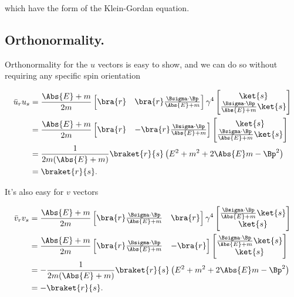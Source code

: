 which have the form of the Klein-Gordan equation.

\subsection{Orthonormality.}

Orthonormality for the $u$ vectors is easy to show, and we can do so without requiring any specific spin orientation

\begin{align*}
\bar{u}_r u_s 
&= 
\frac{\Abs{E} + m}{2m}
\begin{bmatrix}
\bra{r} &
\bra{r} \frac{\Bsigma \cdot \Bp}{\Abs{E} + m} 
\end{bmatrix}
\gamma^4
\begin{bmatrix}
\ket{s} \\
\frac{\Bsigma \cdot \Bp}{\Abs{E} + m} \ket{s}
\end{bmatrix} \\
&=
\frac{\Abs{E} + m}{2m}
\begin{bmatrix}
\bra{r} &
-\bra{r} \frac{\Bsigma \cdot \Bp}{\Abs{E} + m} 
\end{bmatrix}
\begin{bmatrix}
\ket{s} \\
\frac{\Bsigma \cdot \Bp}{\Abs{E} + m} \ket{s}
\end{bmatrix} \\
&=
\frac{1}{2m(\Abs{E} + m)}
\braket{r}{s} \left( E^2 + m^2 + 2 \Abs{E} m - \Bp^2 \right) \\
&=
\braket{r}{s}.
\end{align*}

It's also easy for $v$ vectors

\begin{align*}
\bar{v}_r v_s 
&= 
\frac{\Abs{E} + m}{2m}
\begin{bmatrix}
\bra{r} \frac{\Bsigma \cdot \Bp}{\Abs{E} + m} &
\bra{r} 
\end{bmatrix}
\gamma^4
\begin{bmatrix}
\frac{\Bsigma \cdot \Bp}{\Abs{E} + m} \ket{s} \\
\ket{s} 
\end{bmatrix} \\
&=
\frac{\Abs{E} + m}{2m}
\begin{bmatrix}
\bra{r} \frac{\Bsigma \cdot \Bp}{\Abs{E} + m} &
-\bra{r} 
\end{bmatrix}
\begin{bmatrix}
\frac{\Bsigma \cdot \Bp}{\Abs{E} + m} \ket{s} \\
\ket{s} 
\end{bmatrix} \\
&=
-\frac{1}{2m(\Abs{E} + m)}
\braket{r}{s} \left( E^2 + m^2 + 2 \Abs{E} m - \Bp^2 \right) \\
&=
-\braket{r}{s}.
\end{align*}

